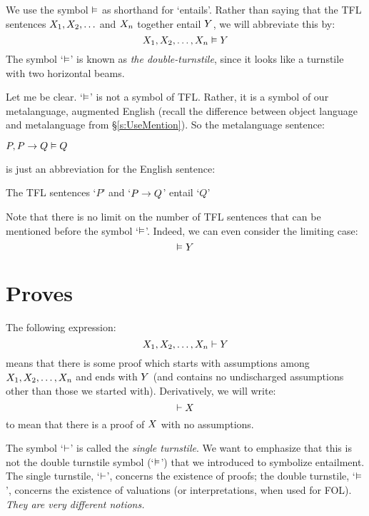 \label{doubleTurnstile}
We use the symbol $\vDash$ as shorthand for `entails'.
Rather than saying that the TFL sentences $X_1, X_2, \ldots$ and $X_n$ together entail $Y$, we will abbreviate this by:
$$X_1, X_2, \ldots, X_n \vDash Y$$
The symbol `$\vDash$' is known as \emph{the double-turnstile}, since it looks like a turnstile with two horizontal beams.

Let me be clear. `$\vDash$' is not a symbol of TFL. Rather, it is a symbol of our metalanguage, augmented English (recall the difference between object language and metalanguage from \S\ref{s:UseMention}). So the metalanguage sentence:
\begin{ebullet}
	\item $P, P \rightarrow Q \vDash Q$
\end{ebullet}
is just an abbreviation for the English sentence:
\begin{ebullet}
	\item The TFL sentences `$P$' and `$P \rightarrow Q$' entail `$Q$'
\end{ebullet}
Note that there is no limit on the number of TFL sentences that can be mentioned before the symbol `$\vDash$'. Indeed, we can even consider the limiting case:
$$\vDash Y$$

\section{Proves}
The following expression:
$$X_1, X_2, \ldots, X_n \vdash Y$$
means that there is some proof which starts with assumptions among $X_1, X_2, \ldots, X_n$ and ends with $Y$ (and contains no undischarged assumptions other than those we started with). Derivatively, we will write:
$$\vdash X$$
to mean that there is a proof of $X$ with no assumptions.

The symbol `$\vdash$' is called the \emph{single turnstile}. We want to emphasize that this is not the {double turnstile} symbol (`$\vDash$') that we introduced  to symbolize entailment. The single turnstile, `$\vdash$', concerns the existence of proofs; the double turnstile, `$\vDash$', concerns the existence of valuations (or interpretations, when used for FOL). \emph{They are very different notions.}




